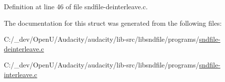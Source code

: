 Definition at line 46 of file sndfile-\/deinterleave.\+c.



The documentation for this struct was generated from the following files\+:\begin{DoxyCompactItemize}
\item 
C\+:/\+\_\+dev/\+Open\+U/\+Audacity/audacity/lib-\/src/libsndfile/programs/\hyperlink{sndfile-deinterleave_8c}{sndfile-\/deinterleave.\+c}\item 
C\+:/\+\_\+dev/\+Open\+U/\+Audacity/audacity/lib-\/src/libsndfile/programs/\hyperlink{sndfile-interleave_8c}{sndfile-\/interleave.\+c}\end{DoxyCompactItemize}

